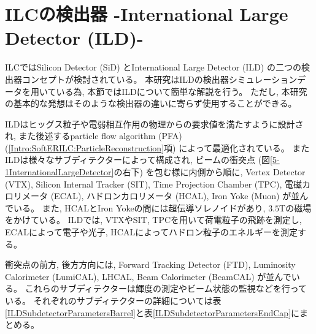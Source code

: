 \section{ILCの検出器 -International Large Detector (ILD)-} \label{Intro:InternationalLargeDetector}

ILCではSilicon Detector (SiD) とInternational Large Detector (ILD) の二つの検出器コンセプトが検討されている。
本研究はILDの検出器シミュレーションデータを用いている為, 本節ではILDについて簡単な解説を行う。
ただし, 本研究の基本的な発想はそのような検出器の違いに寄らず使用することができる。

ILDはヒッグス粒子や電弱相互作用の物理からの要求値を満たすように設計され, また後述するparticle flow algorithm (PFA) (\ref{Intro:SoftERILC:ParticleReconstruction}項) によって最適化されている。
またILDは様々なサブディテクターによって構成され, ビームの衝突点 (図\ref{5-1InternationalLargeDetector}の右下) を包む様に内側から順に, Vertex Detector (VTX), Silicon Internal Tracker (SIT), Time Projection Chamber (TPC), 電磁カロリメータ (ECAL), ハドロンカロリメータ (HCAL), Iron Yoke (Muon) が並んでいる。
また, HCALとIron Yokeの間には超伝導ソレノイドがあり, $3.5 \mathrm{T}$の磁場をかけている。
ILDでは, VTXやSIT, TPCを用いて荷電粒子の飛跡を測定し, ECALによって電子や光子, HCALによってハドロン粒子のエネルギーを測定する。

衝突点の前方, 後方方向には, Forward Tracking Detector (FTD), Luminosity Calorimeter (LumiCAL), LHCAL, Beam Calorimeter (BeamCAL) が並んでいる。
これらのサブディテクターは輝度の測定やビーム状態の監視などを行っている。
それぞれのサブディテクターの詳細については表\ref{ILDSubdetectorParametersBarrel}と表\ref{ILDSubdetectorParametersEndCap}にまとめる。

